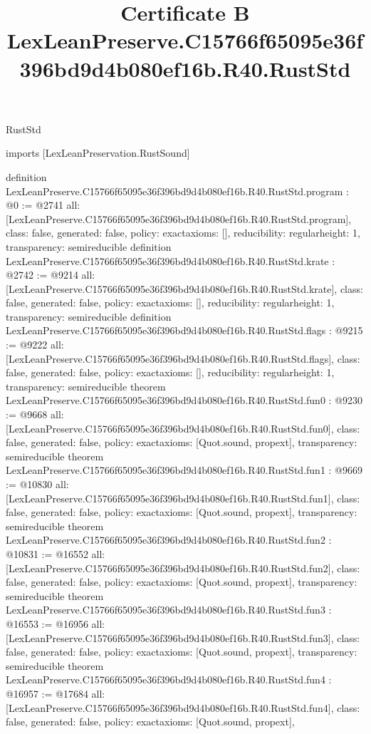 \begin{lexlean}{RustStd}
\title{Certificate B LexLeanPreserve.C15766f65095e36f396bd9d4b080ef16b.R40.RustStd}
\begin{coremodule}
imports [LexLeanPreservation.RustSound]

definition LexLeanPreserve.C15766f65095e36f396bd9d4b080ef16b.R40.RustStd.program : @0 := @2741 {
  all: [LexLeanPreserve.C15766f65095e36f396bd9d4b080ef16b.R40.RustStd.program],
  class: false,
  generated: false,
  policy: exact{axioms: []},
  reducibility: regular{height: 1},
  transparency: semireducible
}
definition LexLeanPreserve.C15766f65095e36f396bd9d4b080ef16b.R40.RustStd.krate : @2742 := @9214 {
  all: [LexLeanPreserve.C15766f65095e36f396bd9d4b080ef16b.R40.RustStd.krate],
  class: false,
  generated: false,
  policy: exact{axioms: []},
  reducibility: regular{height: 1},
  transparency: semireducible
}
definition LexLeanPreserve.C15766f65095e36f396bd9d4b080ef16b.R40.RustStd.flags : @9215 := @9222 {
  all: [LexLeanPreserve.C15766f65095e36f396bd9d4b080ef16b.R40.RustStd.flags],
  class: false,
  generated: false,
  policy: exact{axioms: []},
  reducibility: regular{height: 1},
  transparency: semireducible
}
theorem LexLeanPreserve.C15766f65095e36f396bd9d4b080ef16b.R40.RustStd.fun0 : @9230 := @9668 {
  all: [LexLeanPreserve.C15766f65095e36f396bd9d4b080ef16b.R40.RustStd.fun0],
  class: false,
  generated: false,
  policy: exact{axioms: [Quot.sound, propext]},
  transparency: semireducible
}
theorem LexLeanPreserve.C15766f65095e36f396bd9d4b080ef16b.R40.RustStd.fun1 : @9669 := @10830 {
  all: [LexLeanPreserve.C15766f65095e36f396bd9d4b080ef16b.R40.RustStd.fun1],
  class: false,
  generated: false,
  policy: exact{axioms: [Quot.sound, propext]},
  transparency: semireducible
}
theorem LexLeanPreserve.C15766f65095e36f396bd9d4b080ef16b.R40.RustStd.fun2 : @10831 := @16552 {
  all: [LexLeanPreserve.C15766f65095e36f396bd9d4b080ef16b.R40.RustStd.fun2],
  class: false,
  generated: false,
  policy: exact{axioms: [Quot.sound, propext]},
  transparency: semireducible
}
theorem LexLeanPreserve.C15766f65095e36f396bd9d4b080ef16b.R40.RustStd.fun3 : @16553 := @16956 {
  all: [LexLeanPreserve.C15766f65095e36f396bd9d4b080ef16b.R40.RustStd.fun3],
  class: false,
  generated: false,
  policy: exact{axioms: [Quot.sound, propext]},
  transparency: semireducible
}
theorem LexLeanPreserve.C15766f65095e36f396bd9d4b080ef16b.R40.RustStd.fun4 : @16957 := @17684 {
  all: [LexLeanPreserve.C15766f65095e36f396bd9d4b080ef16b.R40.RustStd.fun4],
  class: false,
  generated: false,
  policy: exact{axioms: [Quot.sound, propext]},
}
\end{coremodule}
\end{lexlean}
